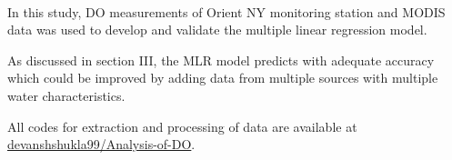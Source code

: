 \paragraph{}
    In this study, DO measurements of Orient NY monitoring station and MODIS data was used to develop and validate the multiple linear regression model.

    As discussed in section III, the MLR model predicts with adequate accuracy which could be improved by adding data from multiple sources with multiple water characteristics.

    All codes for extraction and processing of data are available at \href{https://github.com/devanshshukla99/Analysis-of-DO}{devanshshukla99/Analysis-of-DO}.